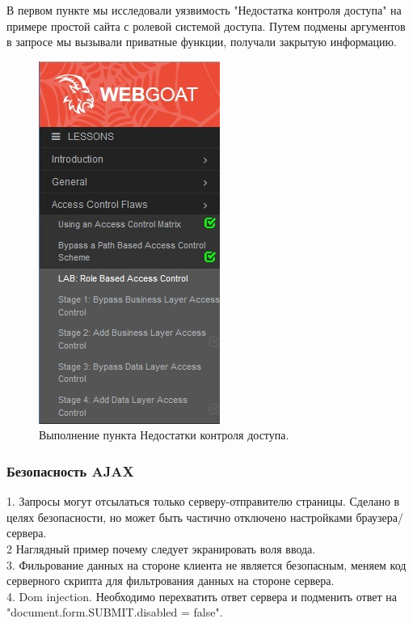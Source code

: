 \documentclass[10pt,a4paper]{article}
\begin{document}
В первом пункте мы исследовали уязвимость "Недостатка контроля доступа" на примере простой сайта с ролевой системой доступа. Путем подмены аргументов в запросе мы вызывали приватные функции, получали закрытую информацию. 

\begin{figure}[h!]
\centering
\includegraphics[scale=0.5]{1.jpg}
\caption{Выполнение пункта Недостатки контроля доступа.}
\end{figure}

\subsubsection{Безопасность AJAX}

1. Запросы могут отсылаться только серверу-отправителю страницы. Сделано в целях безопасности, но может быть частично отключено настройками браузера/сервера.\\

2 Наглядный пример почему следует экранировать воля ввода.\\

3. Фильрование данных на стороне клиента не является безопасным, меняем код серверного скрипта для фильтрования данных на стороне сервера.\\

4. Dom injection. Необходимо перехватить ответ сервера и подменить ответ на "document.form.SUBMIT.disabled = false".\\
\end{document}
